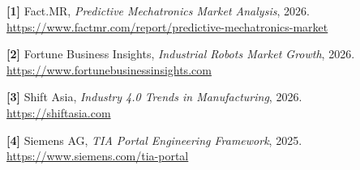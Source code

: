 \documentclass[10pt]{article}
\begin{document}
\begin{tcolorbox}[colback=azulClaro,colframe=azulOscuro,
  arc=0pt,boxrule=0.8pt,left=8pt,right=8pt,top=6pt,bottom=6pt]
\small\color{textoGris}

\noindent\textcolor{azulOscuro}{\textbf{[1]}} Fact.MR,
\textit{Predictive Mechatronics Market Analysis}, 2026.\\
\url{https://www.factmr.com/report/predictive-mechatronics-market}

\vspace{4pt}
\noindent\textcolor{azulOscuro}{\textbf{[2]}} Fortune Business Insights,
\textit{Industrial Robots Market Growth}, 2026.\\
\url{https://www.fortunebusinessinsights.com}

\vspace{4pt}
\noindent\textcolor{azulOscuro}{\textbf{[3]}} Shift Asia,
\textit{Industry 4.0 Trends in Manufacturing}, 2026.\\
\url{https://shiftasia.com}

\vspace{4pt}
\noindent\textcolor{azulOscuro}{\textbf{[4]}} Siemens AG,
\textit{TIA Portal Engineering Framework}, 2025.\\
\url{https://www.siemens.com/tia-portal}
\end{tcolorbox}
\end{document}
